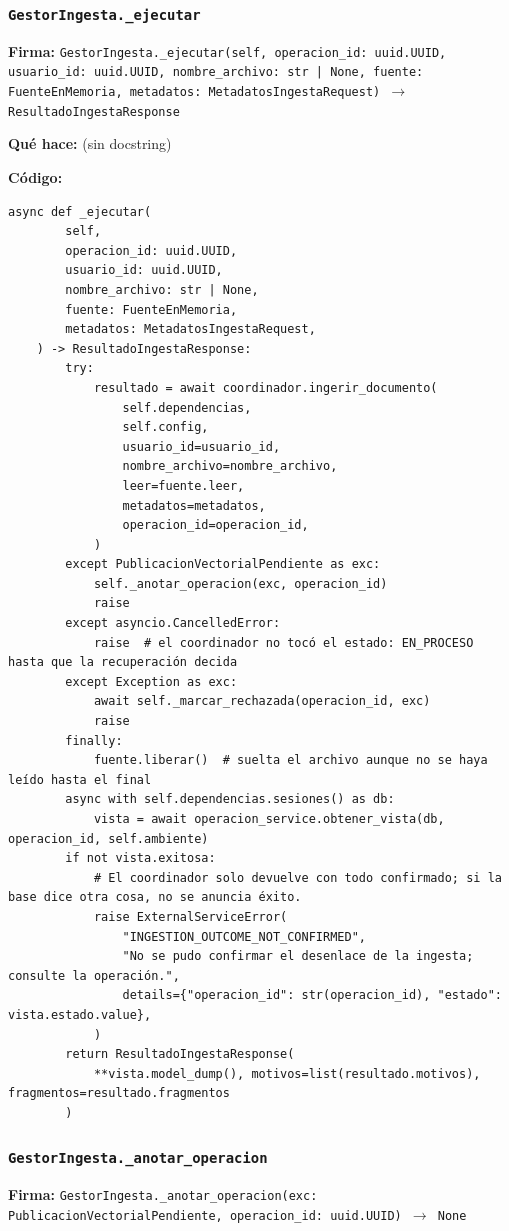 \documentclass[11pt,a4paper]{article}
\begin{document}
\subsubsection*{\texttt{GestorIngesta.\_ejecutar}}
\textbf{Firma:} \texttt{GestorIngesta.\_ejecutar(self, operacion\_id: uuid.UUID, usuario\_id: uuid.UUID, nombre\_archivo: str | None, fuente: FuenteEnMemoria, metadatos: MetadatosIngestaRequest) $\rightarrow$ ResultadoIngestaResponse}

\textbf{Qué hace:} (sin docstring)

\textbf{Código:}
\begin{lstlisting}
async def _ejecutar(
        self,
        operacion_id: uuid.UUID,
        usuario_id: uuid.UUID,
        nombre_archivo: str | None,
        fuente: FuenteEnMemoria,
        metadatos: MetadatosIngestaRequest,
    ) -> ResultadoIngestaResponse:
        try:
            resultado = await coordinador.ingerir_documento(
                self.dependencias,
                self.config,
                usuario_id=usuario_id,
                nombre_archivo=nombre_archivo,
                leer=fuente.leer,
                metadatos=metadatos,
                operacion_id=operacion_id,
            )
        except PublicacionVectorialPendiente as exc:
            self._anotar_operacion(exc, operacion_id)
            raise
        except asyncio.CancelledError:
            raise  # el coordinador no tocó el estado: EN_PROCESO hasta que la recuperación decida
        except Exception as exc:
            await self._marcar_rechazada(operacion_id, exc)
            raise
        finally:
            fuente.liberar()  # suelta el archivo aunque no se haya leído hasta el final
        async with self.dependencias.sesiones() as db:
            vista = await operacion_service.obtener_vista(db, operacion_id, self.ambiente)
        if not vista.exitosa:
            # El coordinador solo devuelve con todo confirmado; si la base dice otra cosa, no se anuncia éxito.
            raise ExternalServiceError(
                "INGESTION_OUTCOME_NOT_CONFIRMED",
                "No se pudo confirmar el desenlace de la ingesta; consulte la operación.",
                details={"operacion_id": str(operacion_id), "estado": vista.estado.value},
            )
        return ResultadoIngestaResponse(
            **vista.model_dump(), motivos=list(resultado.motivos), fragmentos=resultado.fragmentos
        )
\end{lstlisting}

\subsubsection*{\texttt{GestorIngesta.\_anotar\_operacion}}
\textbf{Firma:} \texttt{GestorIngesta.\_anotar\_operacion(exc: PublicacionVectorialPendiente, operacion\_id: uuid.UUID) $\rightarrow$ None}
\end{document}
